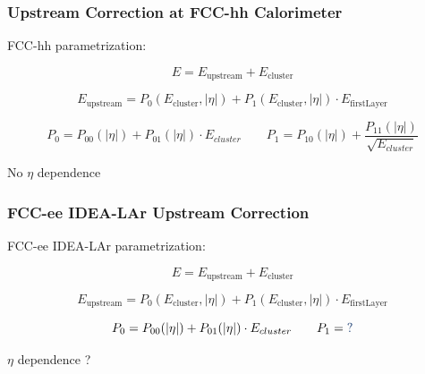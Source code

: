 \documentclass{beamer}
\newcommand{\bluetext}[1]{%
  \textcolor{myBlue}{#1}
}
\newcommand{\redtext}[1]{%
  \textcolor{myRed}{#1}
}
\begin{document}
\begin{frame}
  \frametitle{Upstream Correction at FCC-hh Calorimeter}

  \redtext{FCC-hh} parametrization:

  \begin{equation*}
    E = E_\text{upstream} + E_\text{cluster}
  \end{equation*}

  \begin{equation*}
  E_\text{upstream} = P_0(E_\text{cluster}, |\eta|) +
                      P_1(E_\text{cluster}, |\eta|) \cdot E_\text{firstLayer}
  \end{equation*}

  \begin{equation*}
    P_0 = P_{00}(|\eta|) + P_{01}(|\eta|) \cdot E_{cluster}  \qquad
    P_1 = P_{10}(|\eta|) + \frac{P_{11}(|\eta|)}{\sqrt{E_{cluster}}}
  \end{equation*}

  \begin{center}
    No $\eta$ dependence
  \end{center}


\end{frame}


\begin{frame}
  \frametitle{FCC-ee IDEA-LAr Upstream Correction}

  \redtext{FCC-ee} IDEA-LAr parametrization:

  \begin{equation*}
    E = E_\text{upstream} + E_\text{cluster}
  \end{equation*}

  \begin{equation*}
  E_\text{upstream} = P_0(E_\text{cluster}, |\eta|) +
                      P_1(E_\text{cluster}, |\eta|) \cdot E_\text{firstLayer}
  \end{equation*}

  \begin{equation*}
    P_0 = P_{00}(|\eta|) + P_{01}(|\eta|) \cdot E_{cluster}  \qquad
    P_1 = \bluetext{?}
  \end{equation*}

  \begin{center}
    $\eta$ dependence \bluetext{?}
  \end{center}
\end{frame}
\end{document}
